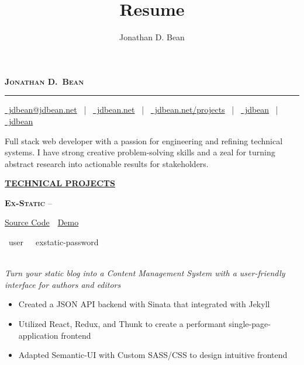 \documentclass[11pt,letterpaper,english]{article}
\title{Resume}
\author{Jonathan D. Bean}
\date{}
\begin{document}
\label{Header}
\vspace*{-40pt}
\begin{singlespace}
\begin{center}
\textsc{\textbf{\LARGE Jonathan D.\ Bean}}
\vspace{3pt}
\hrule height 1pt
\vspace{4pt}
\small
\href{mailto:jdbean@jdbean.net}{\color{black}\faEnvelope~jdbean@jdbean.net}
~|~
\href{https://jdbean.net}{\color{black}\faGlobe~jdbean.net}
~|~
\href{https://jdbean.net/projects}{\color{black}\faEye~jdbean.net/projects}
~|~
\href{https://github.com/jdbean}{\color{black}\faGithub~jdbean}
~|~
\href{https://gitlab.com/jdbean}{\color{black}\faGitlab~jdbean}\\
\small
\end{center}
\end{singlespace}

\label{Description}
\vspace{-12pt}
\begin{center}
Full stack web developer with a passion for engineering and refining technical systems. I have strong creative problem-solving skills and a zeal for turning abstract research into actionable results for stakeholders.
\end{center}

\label{Technical Projects}
\underline{\textbf{\textsc{\large TECHNICAL PROJECTS}}}{\large \par}
\smallskip

\textbf{\textsc{Ex-Static}} 
--\begin{small}
\href{https://github.com/jdbean/Ex-Static}{Source Code}~\color{darkgray}{|}~\href{https://office.johannabearman.duckdns.org}{Demo}
\end{small}
\begin{scriptsize}
\color{gray}
\faUser~user~~\faKey~exstatic-password
\end{scriptsize}\\
\textit{Turn your static blog into a Content Management System with a user-friendly interface for authors and editors}
\begin{itemize}
\item Created a JSON API backend with Sinata that integrated with Jekyll
\item Utilized React, Redux, and Thunk to create a performant single-page-application frontend
\item Adapted Semantic-UI with Custom SASS/CSS to design intuitive frontend
\end{itemize}
\smallskip
\end{document}

